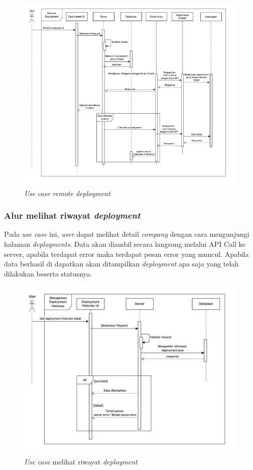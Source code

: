 \begin{figure}[h]
  \centering
  \includegraphics[width=1\textwidth]{resources/chapter-3/usecase/uc-12.jpg}
  \caption{\textit{Use case} \textit{remote deployment}}
  \label{fig:usecase-12}
\end{figure}

\pagebreak

\subsubsection{Alur melihat riwayat \textit{deployment}}

Pada \textit{use case} ini, \textit{user} dapat melihat detail \textit{company} dengan cara mengunjungi halaman \textit{deployments}. Data akan diambil secara langsung melalui API Call ke server, apabila terdapat error maka terdapat pesan error yang muncul. Apabila data berhasil di dapatkan akan ditampilkan \textit{deployment} apa saja yang telah dilakukan beserta statusnya.

\begin{figure}[h]
  \centering
  \includegraphics[width=1\textwidth]{resources/chapter-3/usecase/uc-13.jpg}
  \caption{\textit{Use case} melihat riwayat \textit{deployment}}
  \label{fig:usecase-13}
\end{figure}

\pagebreak